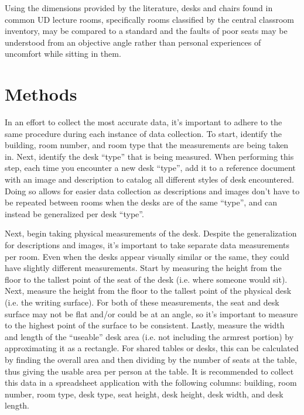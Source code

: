 \documentclass[conference]{IEEEtran}
\begin{document}
\pagebreak

Using the dimensions provided by the literature, desks and chairs found in common UD lecture rooms, specifically rooms classified by the central classroom inventory, may be compared to a standard and the faults of poor seats may be understood from an objective angle rather than personal experiences of uncomfort while sitting in them.




\section{Methods}

In an effort to collect the most accurate data, it’s important to adhere to the same procedure during each instance of data collection. To start, identify the building, room number, and room type that the measurements are being taken in. Next, identify the desk “type” that is being measured. When performing this step, each time you encounter a new desk “type”, add it to a reference document with an image and description to catalog all different styles of desk encountered. Doing so allows for easier data collection as descriptions and images don’t have to be repeated between rooms when the desks are of the same “type”, and can instead be generalized per desk “type”. 

Next, begin taking physical measurements of the desk. Despite the generalization for descriptions and images, it’s important to take separate data measurements per room. Even when the desks appear visually similar or the same, they could have slightly different measurements. Start by measuring the height from the floor to the tallest point of the seat of the desk (i.e. where someone would sit). Next, measure the height from the floor to the tallest point of the physical desk (i.e. the writing surface). For both of these measurements, the seat and desk surface may not be flat and/or could be at an angle, so it’s important to measure to the highest point of the surface to be consistent. Lastly, measure the width and length of the “useable” desk area (i.e. not including the armrest portion) by approximating it as a rectangle. For shared tables or desks, this can be calculated by finding the overall area and then dividing by the number of seats at the table, thus giving the usable area per person at the table. It is recommended to collect this data in a spreadsheet application with the following columns: building, room number, room type, desk type, seat height, desk height, desk width, and desk length.
\end{document}
